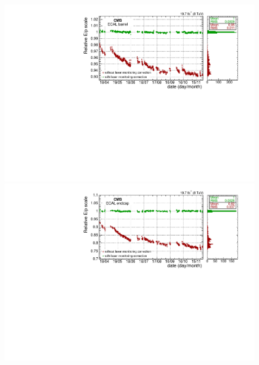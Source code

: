 \begin{figure}
\begin{center}
    \includegraphics[width=0.8\linewidth]{figs/cms/stabilityEB.pdf}
    \includegraphics[width=0.8\linewidth]{figs/cms/stabilityEE.pdf}
\end{center}
\caption{\label{fig:wenuEB}
}
\end{figure}
